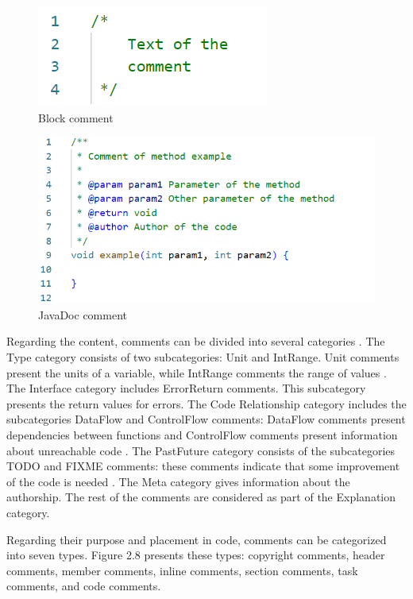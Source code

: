 \begin{figure} [H]
  \centering
  \includegraphics [scale=1]
  {figures/multiline.png}
  \caption{Block comment
  \cite{de2011comment}}
  \label{fig:AnhangsChor}
\end{figure}

\begin{figure} [H]
  \centering
  \includegraphics [scale=0.9]
  {figures/javad.png}
  \caption{JavaDoc comment
  \cite{de2011comment}}
  \label{fig:AnhangsChor}
\end{figure}

Regarding the content, comments can be divided into several categories \cite{de2011comment}. The Type category consists of two subcategories: Unit and IntRange. Unit comments present the units of a variable, while IntRange comments the range of values \cite{de2011comment}.
The Interface category includes ErrorReturn comments. This subcategory presents the return values for errors. 
The Code Relationship category includes the subcategories DataFlow and ControlFlow comments: DataFlow comments present dependencies between functions and ControlFlow comments present information about unreachable code \cite{de2011comment}.
The PastFuture category consists of the subcategories TODO and FIXME comments: these comments indicate that some improvement of the code is needed \cite{de2011comment}.
The Meta category gives information about the authorship. The rest of the comments are considered as part of the Explanation category.


Regarding their purpose and placement in code, comments can be categorized into seven types.  Figure 2.8 presents these types: copyright comments, header comments, member comments, inline comments, section comments, task comments, and code comments. 

